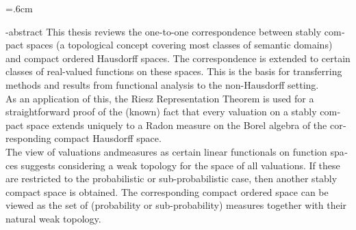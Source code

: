 \baselineskip=.6cm
\begin{latin}
\en-abstract{
This thesis reviews the one-to-one correspondence between stably compact spaces (a topological
concept covering most classes of semantic domains) and compact ordered Hausdorff spaces. The
correspondence is extended to certain classes of real-valued functions on these spaces. This is the
basis for transferring methods and results from functional analysis to the non-Hausdorff setting.
\\
As an application of this, the Riesz Representation Theorem is used for a straightforward proof of
the (known) fact that every valuation on a stably compact space extends uniquely to a Radon measure
on the Borel algebra of the corresponding compact Hausdorff space.
\\
The view of valuations andmeasures as certain linear functionals on function spaces suggests
considering a weak topology for the space of all valuations. If these are restricted to the probabilistic
or sub-probabilistic case, then another stably compact space is obtained. The corresponding compact
ordered space can be viewed as the set of (probability or sub-probability) measures together with their
natural weak topology.
}
\latinftitle
\end{latin}
